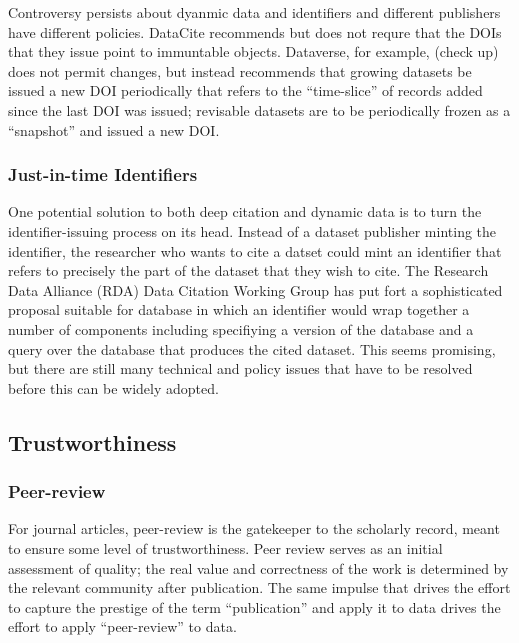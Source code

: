 \documentclass[10pt,a4paper,twocolumn]{article}
\begin{document}
Controversy persists about dyanmic data and identifiers and different publishers have different policies. 
DataCite recommends but does not requre that the DOIs that they issue point to immuntable objects. 
Dataverse, for example, (check up) does not permit changes, but instead recommends that growing datasets be issued a new DOI periodically that refers to the ``time-slice'' of records added since the last DOI was issued; revisable datasets are to be periodically frozen as a ``snapshot'' and issued a new DOI.

\subsubsection{Just-in-time Identifiers}\label{just-in-time-identifiers}

One potential solution to both deep citation and dynamic data is to turn the identifier-issuing process on its head. 
Instead of a dataset publisher minting the identifier, the researcher who wants to cite a datset could mint an identifier that refers to precisely the part of the dataset that they wish to cite. 
The Research Data Alliance (RDA) Data Citation Working Group has put fort a sophisticated proposal suitable for database in which an identifier would wrap together a number of components including specifiying a version of the database and a query over the database that produces the cited dataset. 
This seems promising, but there are still many technical and policy issues that have to be resolved before this can be widely adopted.

\subsection*{Trustworthiness}\label{trustworthiness}

\subsubsection{Peer-review}\label{peer-review}

For journal articles, peer-review is the gatekeeper to the scholarly record, meant to ensure some level of trustworthiness. 
Peer review serves as an initial assessment of quality; the real value and correctness of the work is determined by the relevant community after publication. 
The same impulse that drives the effort to capture the prestige of the term ``publication'' and apply it to data drives the effort to apply ``peer-review'' to data.
\end{document}
